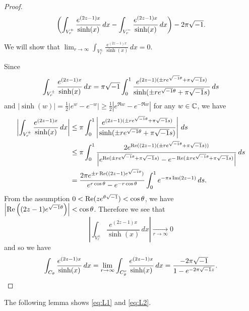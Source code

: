 \begin{proof}
\begin{equation*}
\begin{split}
  \left(
    \int_{V_{r}^{+}}\frac{e^{(2z-1)x}}{\sinh(x)}\,dx
    -
    \int_{V_{r}^{-}}\frac{e^{(2z-1)x}}{\sinh(x)}\,dx
  \right)
  -
  2\pi\sqrt{-1}.
\end{split}
\end{equation*}
\par
We will show that $\displaystyle\lim_{r\to\infty}\int_{V_{r}^{\pm}}\frac{e^{(2z-1)x}}{\sinh(x)}\,dx=0$.
\par
Since
\begin{equation*}
  \int_{V_{r}^{\pm}}\frac{e^{(2z-1)x}}{\sinh(x)}\,dx
  =
  \pi\sqrt{-1}
  \int_{0}^{1}\frac{e^{(2z-1)(\pm re^{\sqrt{-1}\theta}+\pi\sqrt{-1} s)}}{\sinh(\pm re^{\sqrt{-1}\theta}+\pi\sqrt{-1} s)}\,ds
\end{equation*}
and $|\sinh(w)|=\frac{1}{2}\left|e^{w}-e^{-w}\right|\ge\frac{1}{2}\left|e^{\Re{w}}-e^{-\Re{w}}\right|$ for any $w\in\mathbb{C}$, we have
\begin{equation*}
\begin{split}
  \left|
    \int_{V_{r}^{\pm}}\frac{e^{(2z-1)x}}{\sinh(x)}\,dx
  \right|
  &\le
  \pi
  \int_{0}^{1}
  \left|
    \frac{e^{(2z-1)(\pm re^{\sqrt{-1}\theta}+\pi\sqrt{-1} s)}}{\sinh(\pm re^{\sqrt{-1}\theta}+\pi\sqrt{-1} s)}
  \right|
  \,ds
  \\
  &\le
  \pi
  \int_{0}^{1}
  \frac{2e^{\operatorname{Re}((2z-1)(\pm re^{\sqrt{-1}\theta}+\pi\sqrt{-1} s))}}
       {\left|e^{\operatorname{Re}(\pm re^{\sqrt{-1}\theta}+\pi\sqrt{-1} s)}-e^{-\operatorname{Re}(\pm re^{\sqrt{-1}\theta}+\pi\sqrt{-1} s)}\right|}
  \,ds
  \\
  &=
  \frac{2\pi e^{\pm r\operatorname{Re}((2z-1)e^{\sqrt{-1}\theta})}}{e^{r\cos\theta}-e^{-r\cos\theta}}
  \int_{0}^{1}e^{-\pi s\operatorname{Im}(2z-1)}\,ds.
\end{split}
\end{equation*}
From the assumption $0<\operatorname{Re}(ze^{\theta\sqrt{-1}})<\cos\theta$, we have $\left|\operatorname{Re}\left((2z-1)e^{\sqrt{-1}\theta}\right)\right|<\cos\theta$.
Therefore we see that
\begin{equation*}
  \left|
    \int_{V_{r}^{\pm}}\frac{e^{(2z-1)x}}{\sinh(x)}\,dx
  \right|
  \underset{r\to\infty}{\to}0
\end{equation*}
and so we have
\begin{equation*}
  \int_{C_{\theta}}\frac{e^{(2z-1)x}}{\sinh(x)}\,dx
  =
  \lim_{r\to\infty}\int_{C_{\theta}^{r}}\frac{e^{(2z-1)x}}{\sinh(x)}\,dx
  =
  \frac{-2\pi\sqrt{-1}}{1-e^{-2\pi\sqrt{-1} z}}.
\end{equation*}
\end{proof}
\par
The following lemma shows \eqref{eq:L1} and \eqref{eq:L2}.
